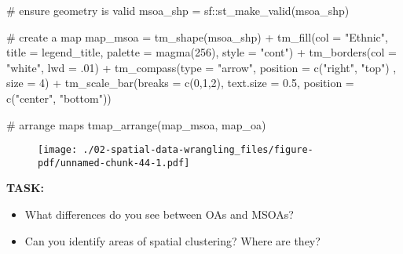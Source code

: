\documentclass[
  letterpaper,
  krantz2]{style/krantz}
\newenvironment{Shaded}{\begin{snugshade}}{\end{snugshade}}
\newcommand{\AttributeTok}[1]{\textcolor[rgb]{0.40,0.45,0.13}{#1}}
\newcommand{\CommentTok}[1]{\textcolor[rgb]{0.37,0.37,0.37}{#1}}
\newcommand{\DecValTok}[1]{\textcolor[rgb]{0.68,0.00,0.00}{#1}}
\newcommand{\FloatTok}[1]{\textcolor[rgb]{0.68,0.00,0.00}{#1}}
\newcommand{\FunctionTok}[1]{\textcolor[rgb]{0.28,0.35,0.67}{#1}}
\newcommand{\NormalTok}[1]{\textcolor[rgb]{0.00,0.23,0.31}{#1}}
\newcommand{\OtherTok}[1]{\textcolor[rgb]{0.00,0.23,0.31}{#1}}
\newcommand{\SpecialCharTok}[1]{\textcolor[rgb]{0.37,0.37,0.37}{#1}}
\newcommand{\StringTok}[1]{\textcolor[rgb]{0.13,0.47,0.30}{#1}}
\providecommand{\tightlist}{%
  \setlength{\itemsep}{0pt}\setlength{\parskip}{0pt}}\usepackage{longtable,booktabs,array}
\begin{document}
\begin{Shaded}
\begin{Highlighting}[]
\CommentTok{\# ensure geometry is valid}
\NormalTok{msoa\_shp }\OtherTok{=}\NormalTok{ sf}\SpecialCharTok{::}\FunctionTok{st\_make\_valid}\NormalTok{(msoa\_shp)}

\CommentTok{\# create a map}
\NormalTok{map\_msoa }\OtherTok{=} \FunctionTok{tm\_shape}\NormalTok{(msoa\_shp) }\SpecialCharTok{+}
  \FunctionTok{tm\_fill}\NormalTok{(}\AttributeTok{col =} \StringTok{"Ethnic"}\NormalTok{, }\AttributeTok{title =}\NormalTok{ legend\_title, }\AttributeTok{palette =} \FunctionTok{magma}\NormalTok{(}\DecValTok{256}\NormalTok{), }\AttributeTok{style =} \StringTok{"cont"}\NormalTok{) }\SpecialCharTok{+} 
  \FunctionTok{tm\_borders}\NormalTok{(}\AttributeTok{col =} \StringTok{"white"}\NormalTok{, }\AttributeTok{lwd =}\NormalTok{ .}\DecValTok{01}\NormalTok{)  }\SpecialCharTok{+} 
  \FunctionTok{tm\_compass}\NormalTok{(}\AttributeTok{type =} \StringTok{"arrow"}\NormalTok{, }\AttributeTok{position =} \FunctionTok{c}\NormalTok{(}\StringTok{"right"}\NormalTok{, }\StringTok{"top"}\NormalTok{) , }\AttributeTok{size =} \DecValTok{4}\NormalTok{) }\SpecialCharTok{+} 
  \FunctionTok{tm\_scale\_bar}\NormalTok{(}\AttributeTok{breaks =} \FunctionTok{c}\NormalTok{(}\DecValTok{0}\NormalTok{,}\DecValTok{1}\NormalTok{,}\DecValTok{2}\NormalTok{), }\AttributeTok{text.size =} \FloatTok{0.5}\NormalTok{, }\AttributeTok{position =}  \FunctionTok{c}\NormalTok{(}\StringTok{"center"}\NormalTok{, }\StringTok{"bottom"}\NormalTok{)) }

\CommentTok{\# arrange maps }
\FunctionTok{tmap\_arrange}\NormalTok{(map\_msoa, map\_oa) }
\end{Highlighting}
\end{Shaded}

\begin{figure}[H]

{\centering \texttt{[image: ./02-spatial-data-wrangling\_files/figure-pdf/unnamed-chunk-44-1.pdf]}

}

\end{figure}

\textbf{TASK:}

\begin{itemize}
\tightlist
\item
  What differences do you see between OAs and MSOAs?
\item
  Can you identify areas of spatial clustering? Where are they?
\end{itemize}
\end{document}
